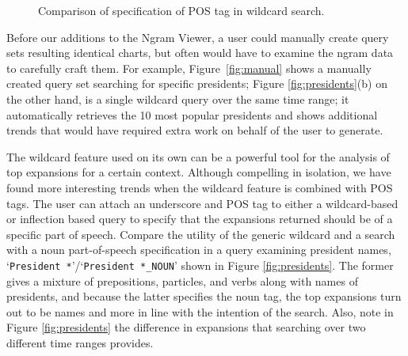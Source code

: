 \documentclass[11pt,a4paper]{article}
\newcommand{\query}[1]{\texttt{#1}}
\begin{document}
\begin{figure}[t]
\vspace*{-1em}
\caption{\label{fig:light} Comparison of specification of POS tag in wildcard search.}
\end{figure}

Before our additions to the Ngram Viewer, a user could manually create query sets resulting identical charts, but often would have to examine the ngram data to carefully craft them. For example, Figure~\ref{fig:manual} shows a manually created query set searching for specific presidents; Figure \ref{fig:presidents}(b) on the other hand, is a single wildcard query over the same time range; it automatically retrieves the 10 most popular presidents and shows additional trends that would have required extra work on behalf of the user to generate.

The wildcard feature used on its own can be a powerful tool for the analysis of top expansions for a certain context.  Although compelling in isolation, we have found more interesting trends when the wildcard feature is combined with POS tags. The user can attach an underscore and POS tag to either a wildcard-based or inflection based query to specify that the expansions returned should be of a specific part of speech. Compare the utility of the generic wildcard and a search with a noun part-of-speech specification in a query examining president names, `\query{President *}'/`\query{President *\_NOUN}' shown in Figure \ref{fig:presidents}. The former gives a mixture of prepositions, particles, and verbs along with names of presidents, and because the latter specifies the noun tag, the top expansions turn out to be names and more in line with the intention of the search. Also, note in Figure \ref{fig:presidents} the difference in expansions that searching over two different time ranges provides.
\end{document}
